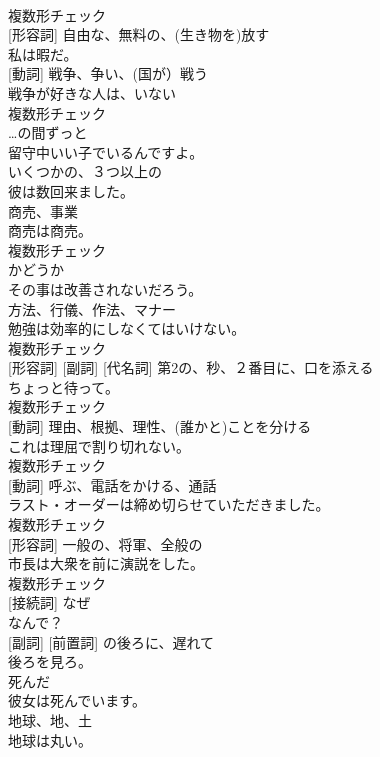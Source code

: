 \documentclass[8pt]{extreport}
\begin{document}
\begin{CJK}{UTF8}{min}
\\	複数形チェック
\\	[動詞] [形容詞]	自由な、無料の、(生き物を)放す	
\\	私は暇だ。	
\\	[名詞] [動詞]	戦争、争い、(国が）戦う	
\\	戦争が好きな人は、いない	
\\	複数形チェック
\\	[前置詞]	…の間ずっと	
\\	留守中いい子でいるんですよ。	
\\	[形容詞]	いくつかの、３つ以上の	
\\	彼は数回来ました。	
\\	[名詞]	商売、事業	
\\	商売は商売。	
\\	複数形チェック
\\	[接続詞]	かどうか	
\\	その事は改善されないだろう。	
\\	[名詞]	方法、行儀、作法、マナー	
\\	勉強は効率的にしなくてはいけない。	
\\	複数形チェック
\\	[動詞] [形容詞] [副詞] [代名詞]	第2の、秒、２番目に、口を添える	
\\	ちょっと待って。	
\\	複数形チェック
\\	[名詞] [動詞]	理由、根拠、理性、(誰かと)ことを分ける	
\\	これは理屈で割り切れない。	
\\	複数形チェック
\\	[名詞] [動詞]	呼ぶ、電話をかける、通話	
\\	ラスト・オーダーは締め切らせていただきました。	
\\	複数形チェック
\\	[名詞] [形容詞]	一般の、将軍、全般の	
\\	市長は大衆を前に演説をした。	
\\	複数形チェック
\\	[副詞] [接続詞]	なぜ	
\\	なんで？	
\\	[形容詞] [副詞] [前置詞]	の後ろに、遅れて	
\\	後ろを見ろ。	
\\	[形容詞]	死んだ	
\\	彼女は死んでいます。	
\\	[名詞]	地球、地、土	
\\	地球は丸い。	

\end{CJK}
\end{document}
